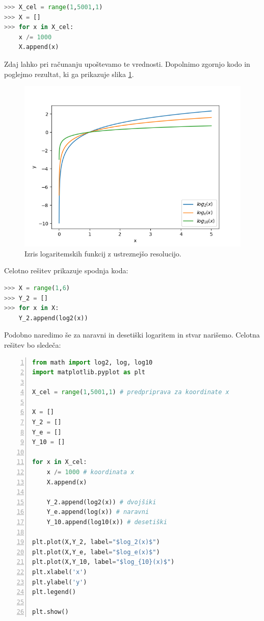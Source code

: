 \begin{resitev}
\begin{lstlisting}[language=Python]
>>> X_cel = range(1,5001,1)
>>> X = []
>>> for x in X_cel:
	x /= 1000
	X.append(x)
\end{lstlisting}
Zdaj lahko pri računanju upoštevamo te vrednosti. Dopolnimo zgornjo kodo in poglejmo rezultat, ki ga prikazuje slika \ref{img:plt9}.
\begin{figure}
    \includegraphics[width=\linewidth]{img/plt9.png}
    \caption{Izris logaritemskih funkcij z ustreznejšo resolucijo.}
    \label{img:plt9}
\end{figure}
Celotno rešitev prikazuje spodnja koda:
\begin{lstlisting}[language=Python]
>>> X = range(1,6)
>>> Y_2 = []
>>> for x in X:
    Y_2.append(log2(x))
\end{lstlisting}
Podobno naredimo še za naravni in desetiški logaritem in stvar narišemo. Celotna rešitev bo sledeča:
\begin{lstlisting}[language=Python,numbers=left]
from math import log2, log, log10
import matplotlib.pyplot as plt

X_cel = range(1,5001,1) # predpriprava za koordinate x

X = []
Y_2 = []
Y_e = []
Y_10 = []

for x in X_cel:
    x /= 1000 # koordinata x
    X.append(x)
    
    Y_2.append(log2(x)) # dvojšiki
    Y_e.append(log(x)) # naravni
    Y_10.append(log10(x)) # desetiški

plt.plot(X,Y_2, label="$log_2(x)$")
plt.plot(X,Y_e, label="$log_e(x)$")
plt.plot(X,Y_10, label="$log_{10}(x)$")
plt.xlabel('x')
plt.ylabel('y')
plt.legend()

plt.show()
\end{lstlisting}

\end{resitev}
